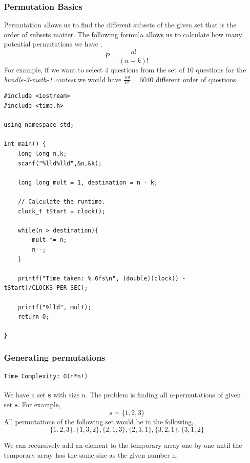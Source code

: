 \documentclass[12pt]{article}
\begin{document}
\subsubsection{Permutation Basics}
Permutation allows us to find the different subsets of the given set that is the order of subsets matter. The following formula allows us to calculate how many potential permutations we have \cite{permutationbasic}.
\[P =\frac{n!}{(n-k)!} \] 
For example, if we want to select 4 questions from the set of 10 questions for the \textit{bundle-3-math-1 contest} we would have $\frac{10!}{6!} = 5040$ different order of questions.
\begin{verbatim}
#include <iostream>
#include <time.h>

using namespace std;

int main() {
    long long n,k;
    scanf("%lld%lld",&n,&k);
    
    long long mult = 1, destination = n - k; 
    
    // Calculate the runtime.
    clock_t tStart = clock();
    
    while(n > destination){
        mult *= n;
        n--;
    }
    
    printf("Time taken: %.6fs\n", (double)(clock() - tStart)/CLOCKS_PER_SEC);
    
    printf("%lld", mult);
    return 0;
    
}
\end{verbatim}
\clearpage
\subsubsection{Generating permutations}
\texttt{Time Complexity: O(n*n!) } \\ \\
We have a set \textbf{s} with size n. The problem is finding all n-permutations of given set \textbf{s}. For example,
\[ s = \{1, 2, 3\} \]
All permutations of the following set would be in the following,
\[ \{1,2,3\}, \{1,3,2\}, \{2,1,3\}, \{2,3,1\}, \{3,2,1\}, \{3,1,2\} \]

We can recursively add an element to the temporary array one by one until the temporary array has the same size as the given number n. \cite{permutationall}


\clearpage
\end{document}
